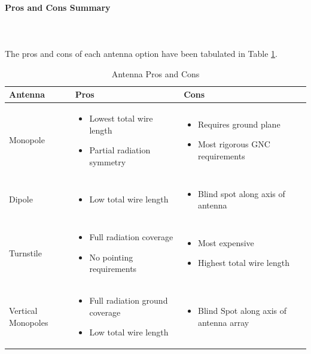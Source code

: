 \paragraph{Pros and Cons Summary}~\\ ~\\
The pros and cons of each antenna option have been tabulated in Table \ref{tbl:antenna_procon}.
\begin{table}[H]
\centering
\begin{tabular}{|p{}|p{}|p{}|} 
\hline
\textbf{Antenna} & \textbf{Pros} & \textbf{Cons}
\\
\hline
     Monopole
     &
    \begin{itemize}
        \item Lowest total wire length
        \item Partial radiation symmetry
    \end{itemize}
    &
    \begin{itemize}
        \item Requires ground plane
        \item Most rigorous GNC requirements
    \end{itemize}
    \\
\hline
     Dipole
     &
    \begin{itemize}
        \item Low total wire length
    \end{itemize}
    &
        \begin{itemize}
        \item Blind spot along axis of antenna
    \end{itemize}
    \\
\hline
    Turnstile
    &
    \begin{itemize}
        \item Full radiation coverage
        \item No pointing requirements
    \end{itemize}
    &
    \begin{itemize}
        \item Most expensive
        \item Highest total wire length
    \end{itemize}
    \\
    \hline
    Vertical Monopoles
    &
    \begin{itemize}
        \item Full radiation ground coverage
        \item Low total wire length 
    \end{itemize}
    &
    \begin{itemize}
        \item Blind Spot along axis of antenna array
    \end{itemize}
    \\
\hline
\end{tabular}
\caption{Antenna Pros and Cons \cite{shop}}
\label{tbl:antenna_procon}
\end{table}
